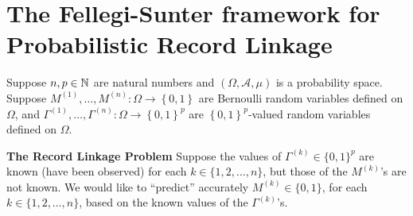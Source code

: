 

\section{The Fellegi-Sunter framework for Probabilistic Record Linkage}
\setcounter{theorem}{0}
\setcounter{equation}{0}

\renewcommand{\theenumi}{\roman{enumi}}
\renewcommand{\labelenumi}{\textnormal{(\theenumi)}$\;\;$}


Suppose $n, p \in \mathbb{N}$ are natural numbers and
$\left(\Omega,\mathcal{A},\mu\right)$ is a probability space.
Suppose $M^{(1)}, \ldots, M^{(n)} : \Omega \longrightarrow \left\{0,1\right\}$
are Bernoulli random variables defined on $\Omega$, and
$\Gamma^{(1)}, \ldots, \Gamma^{(n)} : \Omega \longrightarrow \left\{0,1\right\}^{p}$
are $\left\{0,1\right\}^{p}$-valued random variables defined on $\Omega$.

\vskip 0.5cm
\noindent
\textbf{The Record Linkage Problem}
\vskip 0.05cm
\noindent
Suppose the values of $\Gamma^{(k)} \in \{0,1\}^{p}$ are known (have been observed) for each $k \in \{1,2,\ldots,n\}$,
but those of the $M^{(k)}$'s are not known.
We would like to ``predict'' accurately $M^{(k)} \in \{0,1\}$, for each $k \in \{1,2,\ldots,n\}$,
based on the known values of the $\Gamma^{(k)}$'s.

